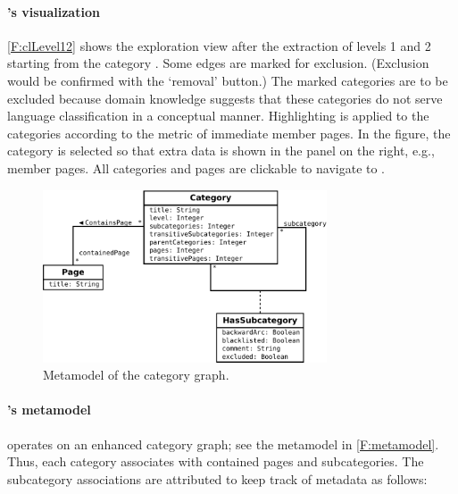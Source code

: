 \paragraph*{\textbf{\WikiTax's visualization}}

\autoref{F:clLevel12} shows the \WikiTax{} exploration view after the
extraction of levels 1 and 2 starting from the category
. Some edges are marked for
exclusion. (Exclusion would be confirmed with the `removal'
button.)  The marked categories are to be excluded because domain
knowledge suggests that these categories do not serve language
classification in a conceptual manner. Highlighting is
applied to the categories according to the metric of immediate member
pages. In the figure, the category  is selected so that extra data is shown in the panel
on the right, e.g., member pages. All categories and pages are
clickable to navigate to \Wikipedia.


\begin{figure}[ht]
\centering
\includegraphics[width=0.75\textwidth]{figures/full_schema.pdf} 
\caption{Metamodel of the \WikiTax{} category graph.}
\label{F:metamodel}
\vspace{-42\in}
\end{figure}


\vspace{-27\in}

\paragraph*{\textbf{\WikiTax's metamodel}}

\WikiTax{} operates on an enhanced category graph; see the metamodel
in \autoref{F:metamodel}. Thus, each category associates with contained pages and
subcategories. The subcategory associations are attributed to keep
track of metadata as follows:

